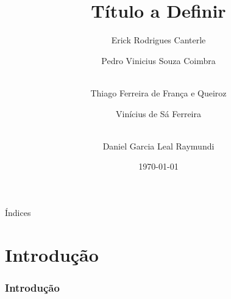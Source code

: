 \documentclass[aspectratio=169,t,xcolor=table]{beamer}
\begin{document}
\title{Título a Definir}
\author{Erick Rodrigues Canterle \and Pedro Vinicius Souza Coimbra \and \\
	Thiago Ferreira de França e Queiroz \and Vinícius de Sá Ferreira \and \\
	Daniel Garcia Leal Raymundi}

\date{\today}
\frame[noframenumbering]{\titlepage}



\begin{frame}{Índices}
	\tableofcontents
\end{frame}



\section{Introdução}

\begin{frame}
	\frametitle{Introdução}
\end{frame}


\begin{frame}{}

\end{frame}


\end{document}
